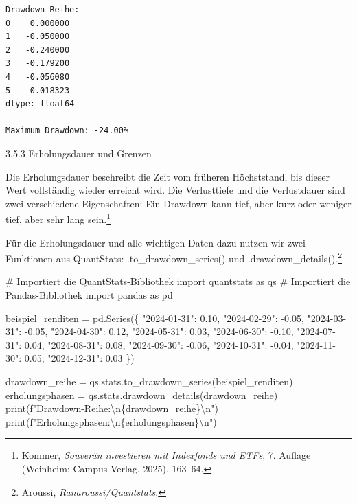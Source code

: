\documentclass[
  ngerman,
  a4paper,
  DIV=11,
  oneside]{scrreprt}
\newenvironment{Shaded}{\begin{snugshade}}{\end{snugshade}}
\newcommand{\BuiltInTok}[1]{\textcolor[rgb]{0.00,0.23,0.31}{#1}}
\newcommand{\CharTok}[1]{\textcolor[rgb]{0.13,0.47,0.30}{#1}}
\newcommand{\CommentTok}[1]{\textcolor[rgb]{0.37,0.37,0.37}{#1}}
\newcommand{\FloatTok}[1]{\textcolor[rgb]{0.68,0.00,0.00}{#1}}
\newcommand{\ImportTok}[1]{\textcolor[rgb]{0.00,0.46,0.62}{#1}}
\newcommand{\NormalTok}[1]{\textcolor[rgb]{0.00,0.23,0.31}{#1}}
\newcommand{\OperatorTok}[1]{\textcolor[rgb]{0.37,0.37,0.37}{#1}}
\newcommand{\SpecialCharTok}[1]{\textcolor[rgb]{0.37,0.37,0.37}{#1}}
\newcommand{\SpecialStringTok}[1]{\textcolor[rgb]{0.13,0.47,0.30}{#1}}
\newcommand{\StringTok}[1]{\textcolor[rgb]{0.13,0.47,0.30}{#1}}
\begin{document}
\begin{verbatim}
Drawdown-Reihe:
0    0.000000
1   -0.050000
2   -0.240000
3   -0.179200
4   -0.056080
5   -0.018323
dtype: float64

Maximum Drawdown: -24.00%
\end{verbatim}

3.5.3 Erholungsdauer und Grenzen

Die Erholungsdauer beschreibt die Zeit vom früheren Höchststand, bis
dieser Wert vollständig wieder erreicht wird. Die Verlusttiefe und die
Verlustdauer sind zwei verschiedene Eigenschaften: Ein Drawdown kann
tief, aber kurz oder weniger tief, aber sehr lang sein.\footnote{Kommer,
  \emph{Souverän investieren mit Indexfonds und ETFs}, 7. Auflage
  (Weinheim: Campus Verlag, 2025), 163--64.}

Für die Erholungsdauer und alle wichtigen Daten dazu nutzen wir zwei
Funktionen aus QuantStats: .to\_drawdown\_series() und
.drawdown\_details().\footnote{Aroussi, \emph{Ranaroussi/Quantstats}.}

\begin{Shaded}
\begin{Highlighting}[]
\CommentTok{\# Importiert die QuantStats{-}Bibliothek}
\ImportTok{import}\NormalTok{ quantstats }\ImportTok{as}\NormalTok{ qs}
\CommentTok{\# Importiert die Pandas{-}Bibliothek}
\ImportTok{import}\NormalTok{ pandas }\ImportTok{as}\NormalTok{ pd}

\NormalTok{beispiel\_renditen }\OperatorTok{=}\NormalTok{ pd.Series(\{}
    \StringTok{"2024{-}01{-}31"}\NormalTok{: }\FloatTok{0.10}\NormalTok{,}
    \StringTok{"2024{-}02{-}29"}\NormalTok{: }\OperatorTok{{-}}\FloatTok{0.05}\NormalTok{,}
    \StringTok{"2024{-}03{-}31"}\NormalTok{: }\OperatorTok{{-}}\FloatTok{0.05}\NormalTok{,}
    \StringTok{"2024{-}04{-}30"}\NormalTok{: }\FloatTok{0.12}\NormalTok{,}
    \StringTok{"2024{-}05{-}31"}\NormalTok{: }\FloatTok{0.03}\NormalTok{,}
    \StringTok{"2024{-}06{-}30"}\NormalTok{: }\OperatorTok{{-}}\FloatTok{0.10}\NormalTok{,}
    \StringTok{"2024{-}07{-}31"}\NormalTok{: }\FloatTok{0.04}\NormalTok{,}
    \StringTok{"2024{-}08{-}31"}\NormalTok{: }\FloatTok{0.08}\NormalTok{,}
    \StringTok{"2024{-}09{-}30"}\NormalTok{: }\OperatorTok{{-}}\FloatTok{0.06}\NormalTok{,}
    \StringTok{"2024{-}10{-}31"}\NormalTok{: }\OperatorTok{{-}}\FloatTok{0.04}\NormalTok{,}
    \StringTok{"2024{-}11{-}30"}\NormalTok{: }\FloatTok{0.05}\NormalTok{,}
    \StringTok{"2024{-}12{-}31"}\NormalTok{: }\FloatTok{0.03}
\NormalTok{\})}

\NormalTok{drawdown\_reihe }\OperatorTok{=}\NormalTok{ qs.stats.to\_drawdown\_series(beispiel\_renditen)}
\NormalTok{erholungsphasen }\OperatorTok{=}\NormalTok{ qs.stats.drawdown\_details(drawdown\_reihe)}
\BuiltInTok{print}\NormalTok{(}\SpecialStringTok{f"Drawdown{-}Reihe:}\CharTok{\textbackslash{}n}\SpecialCharTok{\{}\NormalTok{drawdown\_reihe}\SpecialCharTok{\}}\CharTok{\textbackslash{}n}\SpecialStringTok{"}\NormalTok{)}
\BuiltInTok{print}\NormalTok{(}\SpecialStringTok{f"Erholungsphasen:}\CharTok{\textbackslash{}n}\SpecialCharTok{\{}\NormalTok{erholungsphasen}\SpecialCharTok{\}}\CharTok{\textbackslash{}n}\SpecialStringTok{"}\NormalTok{)}
\end{Highlighting}
\end{Shaded}
\end{document}
